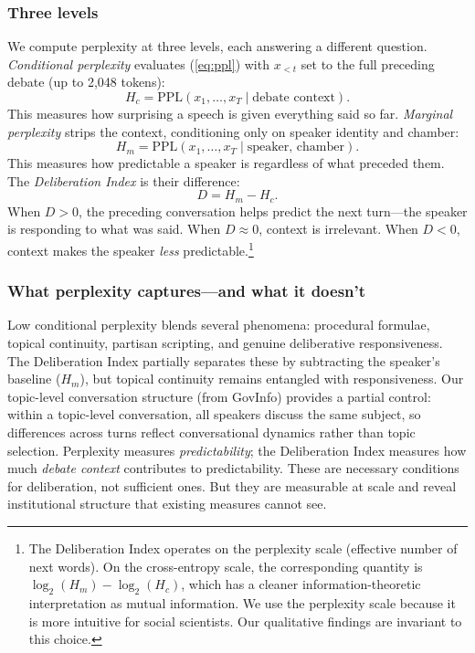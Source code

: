 \documentclass[12pt]{article}
\newcommand{\Hc}{H_c}
\newcommand{\Hm}{H_m}
\newcommand{\DI}{\mathit{D}}
\newcommand{\PPL}{\text{PPL}}
\begin{document}
\subsubsection*{Three levels}
We compute perplexity at three levels, each answering a different question. \textit{Conditional perplexity} evaluates (\ref{eq:ppl}) with $x_{<t}$ set to the full preceding debate (up to 2,048 tokens):
\begin{equation}
\Hc = \PPL(x_1, \ldots, x_T \mid \text{debate context}).
\end{equation}
This measures how surprising a speech is given everything said so far. \textit{Marginal perplexity} strips the context, conditioning only on speaker identity and chamber:
\begin{equation}
\Hm = \PPL(x_1, \ldots, x_T \mid \text{speaker, chamber}).
\end{equation}
This measures how predictable a speaker is regardless of what preceded them. The \textit{Deliberation Index} is their difference:
\begin{equation}
\DI = \Hm - \Hc.
\label{eq:di}
\end{equation}
When $\DI > 0$, the preceding conversation helps predict the next turn---the speaker is responding to what was said. When $\DI \approx 0$, context is irrelevant. When $\DI < 0$, context makes the speaker \textit{less} predictable.\footnote{The Deliberation Index operates on the perplexity scale (effective number of next words). On the cross-entropy scale, the corresponding quantity is $\log_2(\Hm) - \log_2(\Hc)$, which has a cleaner information-theoretic interpretation as mutual information. We use the perplexity scale because it is more intuitive for social scientists. Our qualitative findings are invariant to this choice.}

\subsubsection*{What perplexity captures---and what it doesn't}
Low conditional perplexity blends several phenomena: procedural formulae, topical continuity, partisan scripting, and genuine deliberative responsiveness. The Deliberation Index partially separates these by subtracting the speaker's baseline ($\Hm$), but topical continuity remains entangled with responsiveness. Our topic-level conversation structure (from GovInfo) provides a partial control: within a topic-level conversation, all speakers discuss the same subject, so differences across turns reflect conversational dynamics rather than topic selection. Perplexity measures \textit{predictability}; the Deliberation Index measures how much \textit{debate context} contributes to predictability. These are necessary conditions for deliberation, not sufficient ones. But they are measurable at scale and reveal institutional structure that existing measures cannot see.
\end{document}
